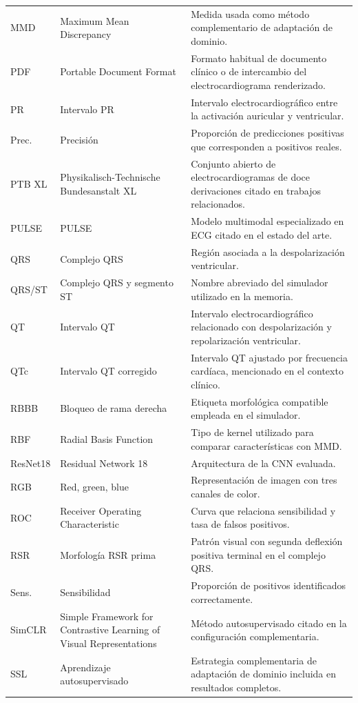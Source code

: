 {\begin{longtable}{@{}>{\raggedright\arraybackslash}p{2.20cm}>{\raggedright\arraybackslash}p{4.10cm}>{\raggedright\arraybackslash}p{7.95cm}@{}}
MMD & Maximum Mean Discrepancy & Medida usada como método complementario de adaptación de dominio. \\
PDF & Portable Document Format & Formato habitual de documento clínico o de intercambio del electrocardiograma renderizado. \\
PR & Intervalo PR & Intervalo electrocardiográfico entre la activación auricular y ventricular. \\
Prec. & Precisión & Proporción de predicciones positivas que corresponden a positivos reales. \\
PTB XL & Physikalisch-Technische Bundesanstalt XL & Conjunto abierto de electrocardiogramas de doce derivaciones citado en trabajos relacionados. \\
PULSE & PULSE & Modelo multimodal especializado en ECG citado en el estado del arte. \\
QRS & Complejo QRS & Región asociada a la despolarización ventricular. \\
QRS/ST & Complejo QRS y segmento ST & Nombre abreviado del simulador utilizado en la memoria. \\
QT & Intervalo QT & Intervalo electrocardiográfico relacionado con despolarización y repolarización ventricular. \\
QTc & Intervalo QT corregido & Intervalo QT ajustado por frecuencia cardíaca, mencionado en el contexto clínico. \\
RBBB & Bloqueo de rama derecha & Etiqueta morfológica compatible empleada en el simulador. \\
RBF & Radial Basis Function & Tipo de kernel utilizado para comparar características con MMD. \\
ResNet18 & Residual Network 18 & Arquitectura de la CNN evaluada. \\
RGB & Red, green, blue & Representación de imagen con tres canales de color. \\
ROC & Receiver Operating Characteristic & Curva que relaciona sensibilidad y tasa de falsos positivos. \\
RSR & Morfología RSR prima & Patrón visual con segunda deflexión positiva terminal en el complejo QRS. \\
Sens. & Sensibilidad & Proporción de positivos identificados correctamente. \\
SimCLR & Simple Framework for Contrastive Learning of Visual Representations & Método autosupervisado citado en la configuración complementaria. \\
SSL & Aprendizaje autosupervisado & Estrategia complementaria de adaptación de dominio incluida en resultados completos. \\

\end{longtable}}
